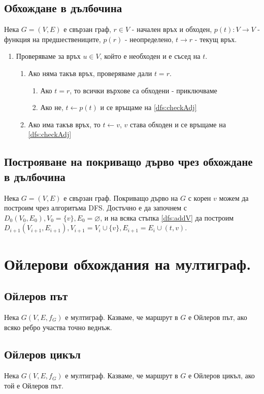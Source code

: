 \documentclass[fleqn,12pt]{article}
\begin{document}
\begin{flushleft}
\subsection{Обхождане в дълбочина} 
Нека $G = (V, E)$ е свързан граф, $r \in V$ - начален връх и обходен, 
$p(t) : V \rightarrow V$ - функция на предшествениците, $p(r)$ - неопределено, $t \rightarrow r$ - текущ връх.
\begin{enumerate}
	\item \label{dfs:checkAdj} Проверяваме за връх $u \in V$, който е необходен и е съсед на $t$.
	\begin{enumerate}
		\item Ако няма такъв връх, проверяваме дали $t = r$.
		\begin{enumerate}
			\item Ако $t = r$, то всички върхове са обходени - приключваме
			\item Ако не, $t \leftarrow p(t)$ и се връщаме на \ref{dfs:checkAdj}
		\end{enumerate}
		\item \label{dfs:addV} Ако има такъв връх, то $t \leftarrow v$, $v$ става обходен и се връщаме на \ref{dfs:checkAdj}
	\end{enumerate}
\end{enumerate} 

\subsection{Построяване на покриващо дърво чрез обхождане в дълбочина} 
Нека $G = (V, E)$ е свързан граф.
Покриващо дърво на $G$ с корен $v$ можем да построим чрез алгоритъма DFS. Достъчно е да започнем
с $D_0(V_0, E_0), V_0 = \{v\}, E_0 = \varnothing$, и на всяка стъпка \ref{dfs:addV} да построим
$D_{i + 1}(V_{i + 1}, E_{i + 1}), V_{i + 1} = V_i \cup \{ v \}, E_{i + 1} = E_i \cup (t, v)$.

\section{Ойлерови обхождания на мултиграф.}

\subsection{Ойлеров път} 
Нека $G(V,E,f_G)$ е мултиграф. Казваме, че маршрут в $G$ е Ойлеров път, ако всяко ребро
участва точно веднъж.

\subsection{Ойлеров цикъл} 
Нека $G(V,E,f_G)$ е мултиграф. Казваме, че маршрут в $G$ е Ойлеров цикъл, ако той е Ойлеров път.


\end{flushleft}
\end{document}
